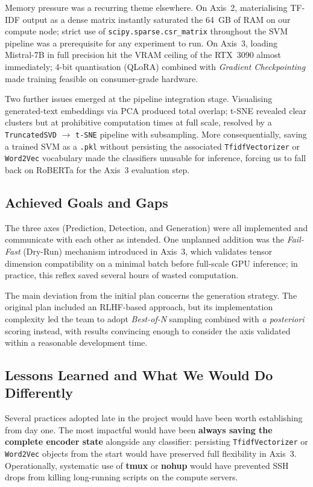 \documentclass[11pt,a4paper]{article}
\begin{document}
Memory pressure was a recurring theme elsewhere. On Axis~2, materialising
TF-IDF output as a dense matrix instantly saturated the 64~GB of RAM on our
compute node; strict use of \texttt{scipy.sparse.csr\_matrix} throughout the
SVM pipeline was a prerequisite for any experiment to run. On Axis~3, loading
Mistral-7B in full precision hit the VRAM ceiling of the RTX~3090 almost
immediately; 4-bit quantisation (QLoRA) combined with \textit{Gradient
Checkpointing} made training feasible on consumer-grade hardware.

Two further issues emerged at the pipeline integration stage. Visualising
generated-text embeddings via PCA produced total overlap; t-SNE revealed
clear clusters but at prohibitive computation times at full scale, resolved
by a \texttt{TruncatedSVD} $\rightarrow$ \texttt{t-SNE} pipeline with
subsampling. More consequentially, saving a trained SVM as a \texttt{.pkl}
without persisting the associated \texttt{TfidfVectorizer} or
\texttt{Word2Vec} vocabulary made the classifiers unusable for inference,
forcing us to fall back on RoBERTa for the Axis~3 evaluation step.

\subsection{Achieved Goals and Gaps}

The three axes (Prediction, Detection, and Generation) were all implemented
and communicate with each other as intended. One unplanned addition was the
\textit{Fail-Fast} (Dry-Run) mechanism introduced in Axis~3, which validates
tensor dimension compatibility on a minimal batch before full-scale GPU
inference; in practice, this reflex saved several hours of wasted computation.

The main deviation from the initial plan concerns the generation strategy.
The original plan included an RLHF-based approach, but its implementation
complexity led the team to adopt \textit{Best-of-N} sampling combined with
\textit{a posteriori} scoring instead, with results convincing enough to
consider the axis validated within a reasonable development time.

\subsection{Lessons Learned and What We Would Do Differently}

Several practices adopted late in the project would have been worth
establishing from day one. The most impactful would have been
\textbf{always saving the complete encoder state} alongside any classifier:
persisting \texttt{TfidfVectorizer} or \texttt{Word2Vec} objects from the
start would have preserved full flexibility in Axis~3. Operationally,
systematic use of \textbf{tmux} or \textbf{nohup} would have prevented SSH
drops from killing long-running scripts on the compute servers.
\end{document}
